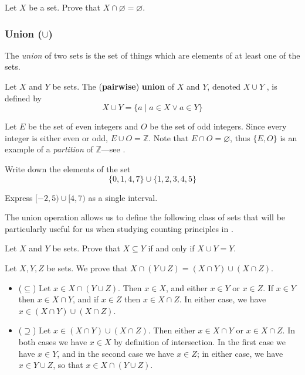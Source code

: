 \begin{exercise}
Let $X$ be a set. Prove that $X \cap \varnothing = \varnothing$.
\end{exercise}

\subsubsection*{Union ($\cup$)}
The \textit{union} of two sets is the set of things which are elements of at least one of the sets.

\begin{definition}
Let $X$ and $Y$ be sets. The (\textbf{pairwise}) \textbf{union} of $X$ and $Y$, denoted $X \cup Y$ , is defined by
\[ X \cup Y = \{ a \mid a \in X \vee a \in Y \} \]
\end{definition}

\begin{example}
Let $E$ be the set of even integers and $O$ be the set of odd integers. Since every integer is either even or odd, $E \cup O = \mathbb{Z}$. Note that $E \cap O = \varnothing$, thus $\{E,O\}$ is an example of a \textit{partition} of $\mathbb{Z}$---see .
\end{example}

\begin{exercise}
Write down the elements of the set
\[ \{ 0, 1, 4, 7 \} \cup \{ 1, 2, 3, 4, 5 \} \]
\end{exercise}

\begin{exercise}
Express $[-2,5) \cup [4,7)$ as a single interval.
\end{exercise}

The union operation allows us to define the following class of sets that will be particularly useful for us when studying counting principles in .

\begin{exercise}
Let $X$ and $Y$ be sets. Prove that $X \subseteq Y$ if and only if $X \cup Y = Y$.
\end{exercise}

\begin{example}
\label{exIntersectionDistributesOverUnion}
Let $X,Y,Z$ be sets. We prove that $X \cap (Y \cup Z) = (X \cap Y) \cup (X \cap Z)$.
\begin{itemize}
\item ($\subseteq$) Let $x \in X \cap (Y \cup Z)$. Then $x \in X$, and either $x \in Y$ or $x \in Z$. If $x \in Y$ then $x \in X \cap Y$, and if $x \in Z$ then $x \in X \cap Z$. In either case, we have $x \in (X \cap Y) \cup (X \cap Z)$.
\item ($\supseteq$) Let $x \in (X \cap Y) \cup (X \cap Z)$. Then either $x \in X \cap Y$ or $x \in X \cap Z$. In both cases we have $x \in X$ by definition of intersection. In the first case we have $x \in Y$, and in the second case we have $x \in Z$; in either case, we have $x \in Y \cup Z$, so that $x \in X \cap (Y \cup Z)$.
\end{itemize}
\end{example}

